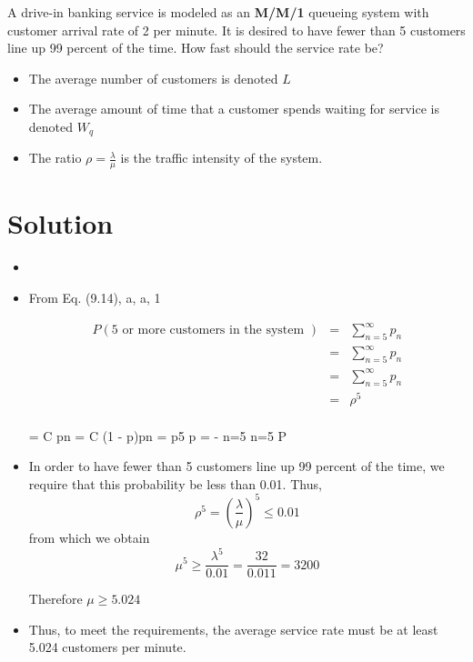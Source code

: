\documentclass[a4paper12pt]{article}
\begin{document}
\large 





\noindent A drive-in banking service is modeled as an \textbf{M/M/1} queueing system with customer arrival rate 
of 2 per minute. It is desired to have fewer than 5 customers line up 99 percent of the time. How 
fast should the service rate be? 

\begin{framed}
\begin{itemize}
\item The average number of customers is denoted $L$
\item The average amount of time that a customer spends waiting for service is denoted $W_q$
    \item  The ratio ${\rho = \frac{\lambda}{\mu}}$ is the traffic intensity of the system.
\end{itemize}
\end{framed}

\section*{Solution}
\begin{itemize}
    \item 
\end{itemize}

\begin{itemize}
    \item From Eq. (9.14), 
a, a, 1 

\begin{eqnarray*}
P(5 \mbox{ or more customers in the system }) &=& \sum^{\infty}_{n=5}  p_{n}\\
&=& \sum^{\infty}_{n=5} p_{n}\\
&=& \sum^{\infty}_{n=5} p_{n}\\
&=& \rho^{5}\\
\end{eqnarray*}

= C pn = C (1 - p)pn = p5 p = - n=5 n=5 P 
\item In order to have fewer than 5 customers line up 99 percent of the time, we require that this probability be 
less than 0.01. Thus, 
\[ \rho^{5} =  \left(\frac{\lambda}{\mu}\right)^{5} \leq 0.01\]
from which we obtain \[ 
\mu^{5} \geq \frac{\lambda^5}{0.01}  = \frac{32}{0.011} = 3200\]

Therefore $\mu \geq 5.024$
\item Thus, to meet the requirements, the average service rate must be at least 5.024 customers per minute.
\end{itemize}
\end{document}
